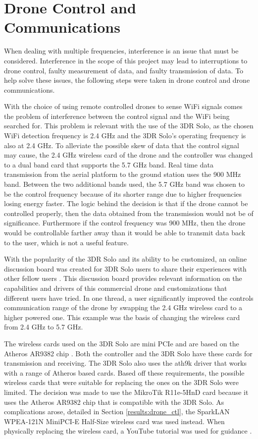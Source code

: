 \section{Drone Control and Communications}
When dealing with multiple frequencies, interference is an issue that must be considered. Interference in the scope of this project may lead to interruptions to drone control, faulty measurement of data, and faulty transmission of data. To help solve these issues, the following steps were taken in drone control and drone communications.\par 

With the choice of using remote controlled drones to sense WiFi signals comes the problem of interference between the control signal and the WiFi being searched for. This problem is relevant with the use of the 3DR Solo, as the chosen WiFi detection frequency is 2.4 GHz and the 3DR Solo’s operating frequency is also at 2.4 GHz. To alleviate the possible skew of data that the control signal may cause, the 2.4 GHz wireless card of the drone and the controller was changed to a dual band card that supports the 5.7 GHz band. Real time data transmission from the aerial platform to the ground station uses the 900 MHz band. Between the two additional bands used, the 5.7 GHz band was chosen to be the control frequency because of its shorter range due to higher frequencies losing energy faster. The logic behind the decision is that if the drone cannot be controlled properly, then the data obtained from the transmission would not be of significance. Furthermore if the control frequency was 900 MHz, then the drone would be controllable farther away than it would be able to transmit data back to the user, which is not a useful feature.\par 
With the popularity of the 3DR Solo and its ability to be customized, an online discussion board was created for 3DR Solo users to share their experiences with other fellow users \cite{3dr_forum}. This discussion board provides relevant information on the capabilities and drivers of this commercial drone and customizations that different users have tried. In one thread, a user significantly improved the controls communication range of the drone by swapping the 2.4 GHz wireless card to a higher powered one. This example was the basis of changing the wireless card from 2.4 GHz to 5.7 GHz.\par 
The wireless cards used on the 3DR Solo are mini PCIe and are based on the Atheros AR9382 chip \cite{3dr_wifi_card}. Both the controller and the 3DR Solo have these cards for transmission and receiving. The 3DR Solo also uses the ath9k driver that works with a range of Atheros based cards. Based off these requirements, the possible wireless cards that were suitable for replacing the ones on the 3DR Solo were limited. The decision was made to use the MikroTik R11e-5HnD card because it uses the Atheros AR9382 chip that is compatible with the 3DR Solo. As complications arose, detailed in Section \ref{results:drone_ctl}, the SparkLAN WPEA-121N MiniPCI-E Half-Size wireless card was used instead. When physically replacing the wireless card, a YouTube tutorial was used for guidance \cite{wifi_card_switch}. \par 

